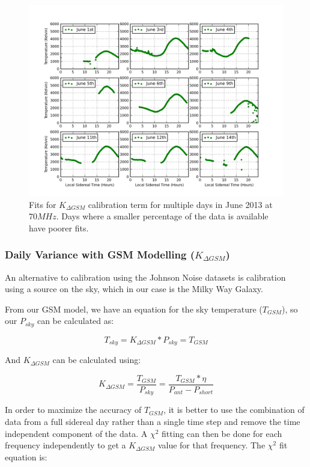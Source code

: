 \begin{figure}[htb]
\begin{center}
\includegraphics[width=0.95\linewidth]{Data_analysis/figures/Combined_Kdgsm_time_series.png}
\caption{Fits for $K_{\Delta GSM}$ calibration term for multiple days in June 2013 at $70 MHz$. Days where a smaller percentage of the data is available have poorer fits. }
\label{Fig:Kdgsm_var}
\end{center}
\end{figure}

\subsubsection{Daily Variance with GSM Modelling ($K_{\Delta GSM}$)}\label{Sec:KGSM}

An alternative to calibration using the Johnson Noise datasets is calibration using a source on the sky, which in our case is the Milky Way Galaxy. 

From our GSM model, we have an equation for the sky temperature ($T_{GSM}$), so our $P_{sky}$ can be calculated as:

\begin{equation}
T_{sky} = K_{\Delta GSM}*P_{sky} = T_{GSM}
\end{equation}

And $K_{\Delta GSM}$ can be calculated using:

\begin{equation}
K_{\Delta GSM} = \frac{T_{GSM}}{P_{sky}} = \frac{T_{GSM}* \eta}{P_{ant}-P_{short}}
\end{equation}

In order to maximize the accuracy of $T_{GSM}$, it is better to use the combination of data from a full sidereal day rather than a single time step and remove the time independent component of the data. A $\chi^2$ fitting can then be done  for each frequency independently to get a $K_{\Delta GSM}$ value for that frequency. The $\chi^2$ fit equation is:

